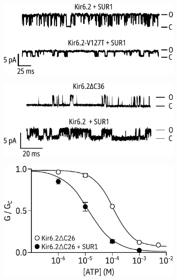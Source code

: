 \begin{figure}[hbtp]
	\centering
	\begin{subfigure}[t]{0.45\textwidth}
		\caption{}\label{ch1fig:singles_ploop}
		\centering
		\includegraphics[width=\textwidth]{single_traces_ploop.pdf}
	\end{subfigure}
	\hfill
	\begin{subfigure}[t]{0.45\textwidth}
		\caption{}\label{ch1fig:singles_sur}
		\centering
		\includegraphics[width=\textwidth]{single_traces_sur.pdf}
	\end{subfigure}
	\vfill
	\begin{subfigure}[t]{0.45\textwidth}
		\caption{}\label{ch1fig:sur_shift}
		\centering
		\includegraphics[width=\textwidth]{tucker_sur_shift.pdf}

\end{subfigure}
\end{figure}
